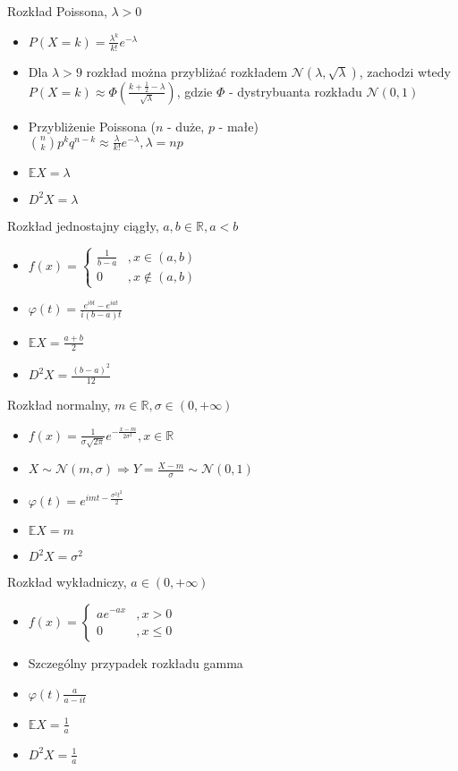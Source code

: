\documentclass[a4paper,12pt]{report}
\theoremstyle{break}
\theoremstyle{definition}
\theoremstyle{defi}
\theoremstyle{break}
\theoremstyle{defi}
\begin{document}
\newpage
{\Large Rozkład Poissona, $ \lambda>0 $}
\begin{itemize}
\item $ P(X=k)=\frac{\lambda^k}{k!}e^{-\lambda} $
\item Dla $ \lambda>9 $ rozkład można przybliżać rozkładem $ \mathcal N\left(\lambda,\sqrt{\lambda}\right) $, zachodzi wtedy\\
$ P(X=k)\approx
\Phi\left(\frac{k+\frac{1}{2}-\lambda}{\sqrt{\lambda}}\right) $,
gdzie $ \Phi $ - dystrybuanta rozkładu $ \mathcal N(0,1) $
\item Przybliżenie Poissona ($ n $ - duże, $ p $ - małe)\\
$ {n\choose k }p^kq^{n-k}\approx\frac{\lambda}{k!}e^{-\lambda},\lambda=np$
\item $ \mathbb{E}X=\lambda $
\item $ D^2X=\lambda $
\end{itemize}
{\Large Rozkład jednostajny ciągły, $ a,b\in \mathbb R ,a<b $}
\begin{multicols}{2}
\begin{itemize}
\item $ f(x)=\left \{
\begin{array}{ll}
\frac{1}{b-a}&,x\in(a,b)\\
0&,x\notin(a,b)
\end{array}
\right . $
\item $ \varphi(t)=\frac{e^{ibt}-e^{iat}}{i(b-a)t} $
\item $ \mathbb{E}X=\frac{a+b}{2} $
\item $ D^2X=\frac{\left(b-a\right)^2}{12} $
\end{itemize}
\end{multicols}
{\Large Rozkład normalny, $ m\in \mathbb R ,\sigma\in \left(0,+\infty \right) $}
\begin{multicols}{2}
\begin{itemize}
\item $ f(x)=\frac{1}{\sigma\sqrt{2\pi}}e^{-\frac{x-m}{2\sigma^2}} ,x\in \mathbb R $
\item $ X\sim\mathcal N(m,\sigma)\Rightarrow Y=\frac{X-m}{\sigma}\sim \mathcal N(0,1) $
\item $ \varphi(t)=e^{imt-\frac{\sigma^2t^2}{2}} $
\item $ \mathbb{E}X=m $
\item $ D^2X=\sigma^2 $
\end{itemize}
\end{multicols}
{\Large Rozkład wykładniczy, $ a\in\left(0,+\infty \right) $}
\begin{multicols}{2}
\begin{itemize}
\item $ f(x)=
\left \{
\begin{array}{ll}
ae^{-ax}&,x>0\\
0&,x\le0
\end{array}
\right . $
\item Szczególny przypadek rozkładu gamma
\item $ \varphi(t)\frac{a}{a-it} $
\item $ \mathbb{E}X=\frac{1}{a} $
\item $ D^2X=\frac{1}{a} $
\end{itemize}
\end{multicols}
\end{document}
